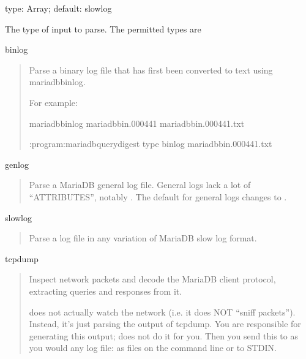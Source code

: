 \documentclass[letterpaper,10pt,english]{sphinxmanual}
\begin{document}
\begin{fulllineitems}
\label{\detokenize{mariadb-query-digest:cmdoption-mariadb-query-digest-type}}
type: Array; default: slowlog

The type of input to parse.  The permitted types are

binlog
\begin{quote}

Parse a binary log file that has first been converted to text using mariadb\sphinxhyphen{}binlog.

For example:

\begin{sphinxVerbatim}[commandchars=\\\{\}]
mariadb\PYGZhy{}binlog mariadb\PYGZhy{}bin.000441 \PYGZgt{} mariadb\PYGZhy{}bin.000441.txt

:program:mariadb\PYGZhy{}query\PYGZhy{}digest \PYGZhy{}\PYGZhy{}type binlog mariadb\PYGZhy{}bin.000441.txt
\end{sphinxVerbatim}
\end{quote}

genlog
\begin{quote}

Parse a MariaDB general log file.  General logs lack a lot of “ATTRIBUTES”,
notably .  The default {\hyperref[\detokenize{mariadb-query-digest:cmdoption-mariadb-query-digest-order-by}]{}} for general logs
changes to .
\end{quote}

slowlog
\begin{quote}

Parse a log file in any variation of MariaDB slow log format.
\end{quote}

tcpdump
\begin{quote}

Inspect network packets and decode the MariaDB client protocol, extracting queries
and responses from it.

 does not actually watch the network (i.e. it does NOT “sniff
packets”).  Instead, it’s just parsing the output of tcpdump.  You are
responsible for generating this output;  does not do it for you.
Then you send this to  as you would any log file: as files on the
command line or to STDIN.


\end{quote}
\end{fulllineitems}
\end{document}
